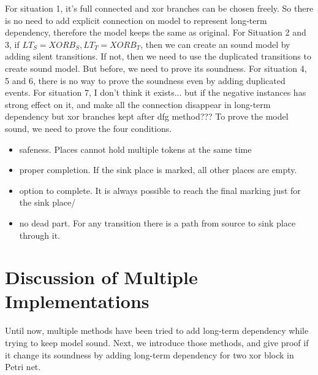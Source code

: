 \documentclass[]{article}
\begin{document}
For situation 1, it's full connected and xor branches can be chosen freely. So there is no need to add explicit connection on model to represent long-term dependency, therefore the model keeps the same as original. 
For Situation 2 and 3, if $LT_S = XORB_S, LT_T= XORB_T$, then we can create an sound model by adding silent transitions. If not, then we need to use the duplicated transitions to create sound model. But before, we need to prove its soundness. 
For situation 4, 5 and 6, there is no way to prove the soundness even by adding duplicated events. 
For situation 7, I don't think it exists... but if the negative instances has strong effect on it, and make all the connection disappear in long-term dependency but xor branches kept after dfg method??? 
To prove the model sound, we need to prove the four conditions.
\begin{itemize}
	\item safeness. Places cannot hold multiple tokens at the same time
	\item proper completion. If the sink place is marked, all other places are empty.
	\item option to complete. It is always possible to reach the final marking just for the sink place/
	\item no dead part. For any transition there is a path from source to sink place through it. 
\end{itemize}

\section{Discussion of Multiple Implementations}
Until now, multiple methods have been tried to add long-term dependency while trying to keep model sound. Next, we introduce those methods, and give proof if it change its soundness by adding long-term dependency for two xor block in Petri net. 
\end{document}
